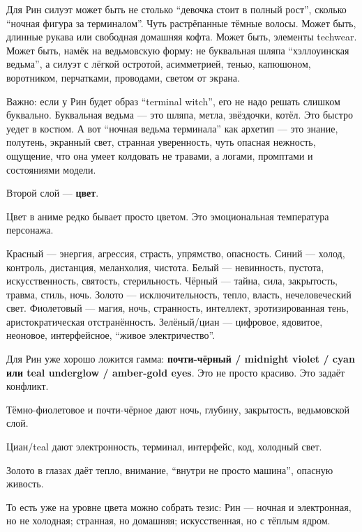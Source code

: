 Для Рин силуэт может быть не столько ``девочка стоит в полный рост'',
сколько ``ночная фигура за терминалом''. Чуть растрёпанные тёмные
волосы. Может быть, длинные рукава или свободная домашняя кофта. Может
быть, элементы techwear. Может быть, намёк на ведьмовскую форму: не
буквальная шляпа ``хэллоуинская ведьма'', а силуэт с лёгкой остротой,
асимметрией, тенью, капюшоном, воротником, перчатками, проводами, светом
от экрана.

Важно: если у Рин будет образ ``terminal witch'', его не надо решать
слишком буквально. Буквальная ведьма --- это шляпа, метла, звёздочки,
котёл. Это быстро уедет в костюм. А вот ``ночная ведьма терминала'' как
архетип --- это знание, полутень, экранный свет, странная уверенность,
чуть опасная нежность, ощущение, что она умеет колдовать не травами, а
логами, промптами и состояниями модели.

Второй слой --- \textbf{цвет}.

Цвет в аниме редко бывает просто цветом. Это эмоциональная температура
персонажа.

Красный --- энергия, агрессия, страсть, упрямство, опасность. Синий ---
холод, контроль, дистанция, меланхолия, чистота. Белый --- невинность,
пустота, искусственность, святость, стерильность. Чёрный --- тайна,
сила, закрытость, травма, стиль, ночь. Золото --- исключительность,
тепло, власть, нечеловеческий свет. Фиолетовый --- магия, ночь,
странность, интеллект, эротизированная тень, аристократическая
отстранённость. Зелёный/\hspace{0pt}циан --- цифровое, ядовитое, неоновое,
интерфейсное, ``живое электричество''.

Для Рин уже хорошо ложится гамма: \textbf{почти-чёрный /\hspace{0pt} midnight violet
/\hspace{0pt} cyan или teal underglow /\hspace{0pt} amber-gold eyes}. Это не просто красиво. Это
задаёт конфликт.

Тёмно-фиолетовое и почти-чёрное дают ночь, глубину, закрытость,
ведьмовской слой.

Циан/\hspace{0pt}teal дают электронность, терминал, интерфейс, код, холодный свет.

Золото в глазах даёт тепло, внимание, ``внутри не просто машина'',
опасную живость.

То есть уже на уровне цвета можно собрать тезис: Рин --- ночная и
электронная, но не холодная; странная, но домашняя; искусственная, но с
тёплым ядром.

